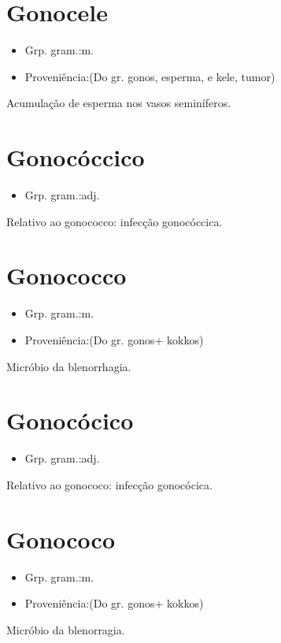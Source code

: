 \section{Gonocele}
\begin{itemize}
\item {Grp. gram.:m.}
\end{itemize}
\begin{itemize}
\item {Proveniência:(Do gr. \textunderscore gonos\textunderscore , esperma, e \textunderscore kele\textunderscore , tumor)}
\end{itemize}
Acumulação de esperma nos vasos seminíferos.
\section{Gonocóccico}
\begin{itemize}
\item {Grp. gram.:adj.}
\end{itemize}
Relativo ao gonococco: \textunderscore infecção gonocóccica\textunderscore .
\section{Gonococco}
\begin{itemize}
\item {Grp. gram.:m.}
\end{itemize}
\begin{itemize}
\item {Proveniência:(Do gr. \textunderscore gonos\textunderscore  + \textunderscore kokkos\textunderscore )}
\end{itemize}
Micróbio da blenorrhagia.
\section{Gonocócico}
\begin{itemize}
\item {Grp. gram.:adj.}
\end{itemize}
Relativo ao gonococo: \textunderscore infecção gonocócica\textunderscore .
\section{Gonococo}
\begin{itemize}
\item {Grp. gram.:m.}
\end{itemize}
\begin{itemize}
\item {Proveniência:(Do gr. \textunderscore gonos\textunderscore  + \textunderscore kokkos\textunderscore )}
\end{itemize}
Micróbio da blenorragia.
